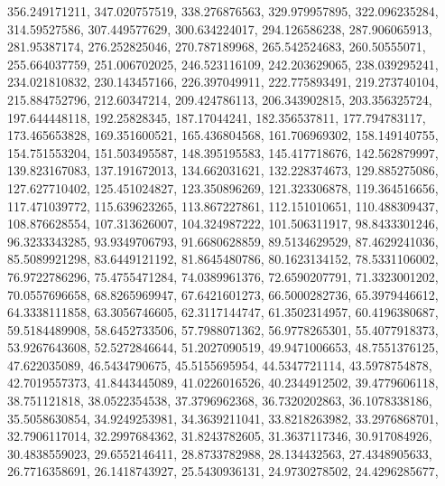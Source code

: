 \begin{code}
\begin{hide}
{     356.249171211,     347.020757519,     338.276876563,
     329.979957895,     322.096235284,      314.59527586,
     307.449577629,     300.634224017,     294.126586238,
     287.906065913,      281.95387174,     276.252825046,
     270.787189968,     265.542524683,      260.50555071,
     255.664037759,     251.006702025,     246.523116109,
     242.203629065,     238.039295241,     234.021810832,
     230.143457166,     226.397049911,     222.775893491,
     219.273740104,     215.884752796,      212.60347214,
     209.424786113,     206.343902815,     203.356325724,
     197.644448118,      192.25828345,      187.17044241,
     182.356537811,     177.794783117,     173.465653828,
     169.351600521,     165.436804568,     161.706969302,
     158.149140755,     154.751553204,     151.503495587,
     148.395195583,     145.417718676,     142.562879997,
     139.823167083,     137.191672013,     134.662031621,
     132.228374673,     129.885275086,     127.627710402,
     125.451024827,     123.350896269,     121.323306878,
     119.364516656,     117.471039772,     115.639623265,
     113.867227861,     112.151010651,     110.488309437,
     108.876628554,     107.313626007,     104.324987222,
     101.506311917,     98.8433301246,     96.3233343285,
     93.9349706793,     91.6680628859,     89.5134629529,
     87.4629241036,     85.5089921298,     83.6449121192,
     81.8645480786,     80.1623134152,     78.5331106002,
     76.9722786296,     75.4755471284,     74.0389961376,
     72.6590207791,     71.3323001202,     70.0557696658,
     68.8265969947,     67.6421601273,     66.5000282736,
     65.3979446612,     64.3338111858,     63.3056746605,
     62.3117144747,     61.3502314957,     60.4196380687,
     59.5184489908,     58.6452733506,     57.7988071362,
     56.9778265301,     55.4077918373,     53.9267643608,
     52.5272846644,     51.2027090519,     49.9471006653,
     48.7551376125,      47.622035089,     46.5434790675,
     45.5155695954,     44.5347721114,     43.5978754878,
     42.7019557373,     41.8443445089,     41.0226016526,
     40.2344912502,     39.4779606118,      38.751121818,
     38.0522354538,     37.3796962368,     36.7320202863,
     36.1078338186,     35.5058630854,     34.9249253981,
     34.3639211041,     33.8218263982,     33.2976868701,
     32.7906117014,     32.2997684362,     31.8243782605,
     31.3637117346,      30.917084926,     30.4838559023,
     29.6552146411,     28.8733782988,      28.134432563,
     27.4348905633,     26.7716358691,     26.1418743927,
     25.5430936131,     24.9730278502,     24.4296285677,
}
\end{hide}
\end{code}
